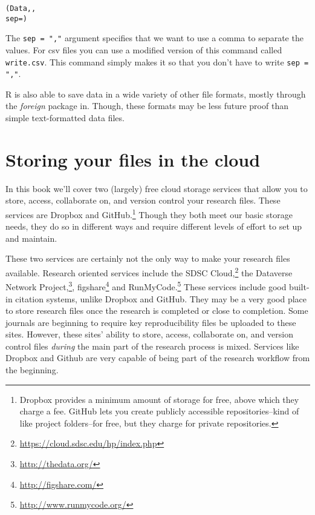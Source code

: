 \begin{knitrout}
\color{fgcolor}\begin{kframe}
\begin{alltt}
(Data, ,
                 sep = )
\end{alltt}
\end{kframe}
\end{knitrout}


\noindent The \texttt{sep = ","} argument specifies that we want to use a comma to separate the values. For csv files you can use a modified version of this command called \texttt{write.csv}. This command simply makes it so that you don't have to write \texttt{sep = ","}. 

R is also able to save data in a wide variety of other file formats, mostly through the {\emph{foreign}} package in. Though, these formats may be less future proof than simple text-formatted data files.

\section{Storing your files in the cloud}

In this book we'll cover two (largely) free cloud storage services that allow you to store, access, collaborate on, and version control your research files. These services are Dropbox and GitHub.\footnote{Dropbox provides a minimum amount of storage for free, above which they charge a fee. GitHub lets you create publicly accessible repositories--kind of like project folders--for free, but they charge for private repositories.} Though they both meet our basic storage needs, they do so in different ways and require different levels of effort to set up and maintain.

These two services are certainly not the only way to make your research files available. Research oriented services include the SDSC Cloud,\footnote{\url{https://cloud.sdsc.edu/hp/index.php}} the Dataverse Network Project,\footnote{\url{http://thedata.org/}}, figshare\footnote{\url{http://figshare.com/}} and RunMyCode.\footnote{\url{http://www.runmycode.org/}} These services include good built-in citation systems, unlike Dropbox and GitHub. They may be a very good place to store research files once the research is completed or close to completion. Some journals are beginning to require key reproducibility files be uploaded to these sites. However, these sites' ability to store, access, collaborate on, and version control files \emph{during} the main part of the research process is mixed. Services like Dropbox and Github are very capable of being part of the research workflow from the beginning.

